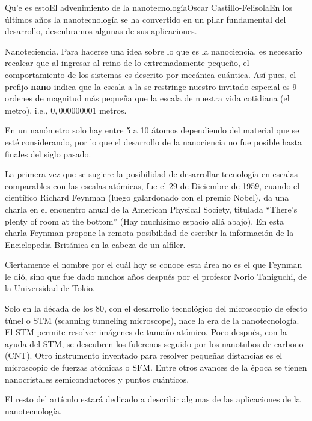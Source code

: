 \begin{Artikel}{Qu'e es esto}{El advenimiento de la nanotecnolog\'ia}{Oscar Castillo-Felisola}{En los \'ultimos a\~nos la nanotecnolog\'ia se ha convertido en un pilar fundamental del desarrollo, descubramos algunas de sus aplicaciones.}

Nanoteciencia. Para hacerse una idea sobre lo que es la nanociencia, es necesario recalcar que al ingresar al reino de lo extremadamente peque\~no, el comportamiento de los sistemas es descrito por mec\'anica cu\'antica. As\'i pues, el prefijo {\bf nano} indica que la escala a la se restringe nuestro invitado especial es 9 ordenes de magnitud m\'as peque\~na que la escala de nuestra vida cotidiana (el metro), i.e., $0,000000001$ metros.


En un nan\'ometro solo hay entre 5 a 10 \'atomos dependiendo del material  que se est\'e considerando, por lo que el desarrollo de la nanociencia no fue posible hasta finales del siglo pasado.




La primera vez que se sugiere la posibilidad de desarrollar tecnolog\'ia en escalas comparables con las escalas at\'omicas, fue el 29 de Diciembre de 1959, cuando  el cient\'ifico Richard Feynman (luego galardonado con el premio Nobel), da una charla  en el encuentro anual de la American Physical  Society, titulada ``There's plenty of room at the bottom'' (Hay much\'isimo espacio all\'a abajo). En esta charla Feynman propone la remota posibilidad de escribir la informaci\'on de la Enciclopedia Brit\'anica en la cabeza de un alfiler.

Ciertamente el nombre por el cu\'al hoy se conoce esta \'area no es el que Feynman le di\'o, sino que fue dado muchos a\~nos despu\'es por el profesor Norio Taniguchi, de la Universidad de Tokio.


Solo en la d\'ecada de los 80, con el desarrollo tecnol\'ogico del microscopio de efecto t\'unel o STM (scanning 
tunneling microscope), nace la era de la nanotecnolog\'ia. El STM permite resolver im\'agenes de tama\~no at\'omico.
Poco despu\'es, con la ayuda del STM, se descubren los fulerenos seguido por los nanotubos de carbono (CNT). Otro instrumento inventado para resolver peque\~nas distancias es el microscopio de fuerzas at\'omicas o SFM. Entre otros avances de la \'epoca se tienen  nanocristales semiconductores y  puntos cu\'anticos.

El resto del art\'iculo estar\'a dedicado a describir algunas de las aplicaciones de la nanotecnolog\'ia.%




\end{Artikel}
